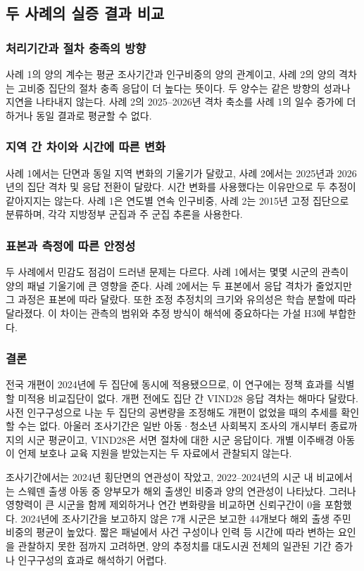 \documentclass[11pt,a4paper]{article}
\begin{document}
\FloatBarrier\subsection{두 사례의 실증 결과 비교}
\subsubsection{처리기간과 절차 충족의 방향}
사례 1의 양의 계수는 평균 조사기간과 인구비중의 양의 관계이고, 사례 2의 양의 격차는 고비중 집단의 절차 충족 응답이 더 높다는 뜻이다. 두 양수는 같은 방향의 성과나 지연을 나타내지 않는다. 사례 2의 2025--2026년 격차 축소를 사례 1의 일수 증가에 더하거나 동일 결과로 평균할 수 없다.

\subsubsection{지역 간 차이와 시간에 따른 변화}
사례 1에서는 단면과 동일 지역 변화의 기울기가 달랐고, 사례 2에서는 2025년과 2026년의 집단 격차 및 응답 전환이 달랐다. 시간 변화를 사용했다는 이유만으로 두 추정이 같아지지는 않는다. 사례 1은 연도별 연속 인구비중, 사례 2는 2015년 고정 집단으로 분류하며, 각각 지방정부 군집과 주 군집 추론을 사용한다.

\subsubsection{표본과 측정에 따른 안정성}
두 사례에서 민감도 점검이 드러낸 문제는 다르다. 사례 1에서는 몇몇 시군의 관측이 양의 패널 기울기에 큰 영향을 준다. 사례 2에서는 두 표본에서 응답 격차가 줄었지만 그 과정은 표본에 따라 달랐다. 또한 조정 추정치의 크기와 유의성은 학습 분할에 따라 달라졌다. 이 차이는 관측의 범위와 추정 방식이 해석에 중요하다는 가설 H3에 부합한다.

\subsubsection{결론}
전국 개편이 2024년에 두 집단에 동시에 적용됐으므로, 이 연구에는 정책 효과를 식별할 미적용 비교집단이 없다. 개편 전에도 집단 간 VIND28 응답 격차는 해마다 달랐다. 사전 인구구성으로 나눈 두 집단의 공변량을 조정해도 개편이 없었을 때의 추세를 확인할 수는 없다. 아울러 조사기간은 일반 아동·청소년 사회복지 조사의 개시부터 종료까지의 시군 평균이고, VIND28은 서면 절차에 대한 시군 응답이다. 개별 이주배경 아동이 언제 보호나 교육 지원을 받았는지는 두 자료에서 관찰되지 않는다.

조사기간에서는 2024년 횡단면의 연관성이 작았고, 2022--2024년의 시군 내 비교에서는 스웨덴 출생 아동 중 양부모가 해외 출생인 비중과 양의 연관성이 나타났다. 그러나 영향력이 큰 시군을 함께 제외하거나 연간 변화량을 비교하면 신뢰구간이 0을 포함했다. 2024년에 조사기간을 보고하지 않은 7개 시군은 보고한 44개보다 해외 출생 주민 비중의 평균이 높았다. 짧은 패널에서 사건 구성이나 인력 등 시간에 따라 변하는 요인을 관찰하지 못한 점까지 고려하면, 양의 추정치를 대도시권 전체의 일관된 기간 증가나 인구구성의 효과로 해석하기 어렵다.
\end{document}
